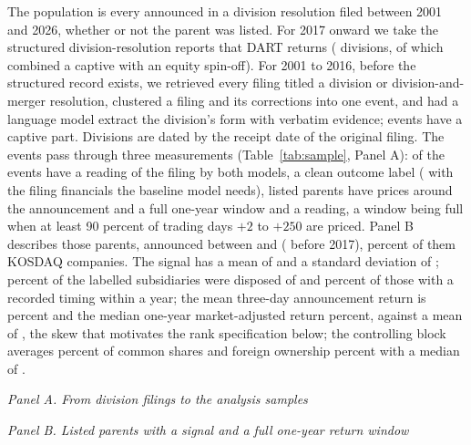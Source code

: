 The population is every \captive{} announced in a division resolution filed between 2001 and 2026, whether or not the parent was listed. For 2017 onward we take the structured division-resolution reports that DART returns (\NNewN{} divisions, \NMixed{} of which combined a captive with an equity spin-off). For 2001 to 2016, before the structured record exists, we retrieved every filing titled a division or division-and-merger resolution, clustered a filing and its corrections into one event, and had a language model extract the division's form with verbatim evidence; \NOldN{} events have a captive part. Divisions are dated by the receipt date of the original filing. The events pass through three measurements (Table~\ref{tab:sample}, Panel A): \NScored{} of the \NAllN{} events have a reading of the filing by both models, \NClean{} a clean outcome label (\NGateOne{} with the filing financials the baseline model needs), \NAllPriced{} listed parents have prices around the announcement and \NScoreOneY{} a full one-year window and a reading, a window being full when at least 90 percent of trading days $+2$ to $+250$ are priced. Panel B describes those \DescN{} parents, announced between \DescYearMin{} and \DescYearMax{} (\DescPeriodOld{} before 2017), \DescKosdaqPct{} percent of them KOSDAQ companies. The signal has a mean of \DescPLlmMean{} and a standard deviation of \DescPLlmSD{}; \DescDisposedPct{} percent of the labelled subsidiaries were disposed of and \DescEarlyRecPct{} percent of those with a recorded timing within a year; the mean three-day announcement return is \DescCarMmMPMean{} percent and the median one-year market-adjusted return \DescBharMadjPPMedian{} percent, against a mean of \DescBharMadjPPMean{}, the skew that motivates the rank specification below; the controlling block averages \DescBlockMean{} percent of common shares and foreign ownership \DescForeignMean{} percent with a median of \DescForeignMedian{}.

\begin{table}[htbp]
\centering
\caption{Sample construction and descriptive statistics}\label{tab:sample}
{\footnotesize\singlespacing\setlength{\tabcolsep}{3pt}
\emph{Panel A. From division filings to the analysis samples}\par\smallskip
\par\medskip
\emph{Panel B. Listed parents with a signal and a full one-year return window}\par\smallskip
{\scriptsize}}
\end{table}


